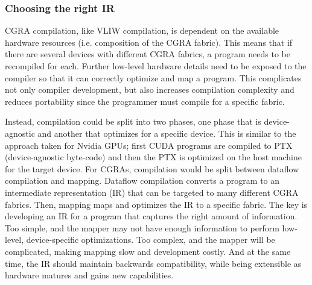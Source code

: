 \subsubsection{Choosing the right IR}
CGRA compilation, like VLIW compilation, is dependent on the available hardware resources (i.e. composition of the CGRA fabric).
% 
% 
This means that if there are several devices with different CGRA fabrics, a program needs to be recompiled for each.
% 
Further low-level hardware details need to be exposed to the compiler so that it can correctly optimize and map a program.
% 
This complicates not only compiler development, but also increases compilation complexity and reduces portability since the programmer must compile for a specific fabric.


Instead, compilation could be split into two phases, one phase that is device-agnostic and another that optimizes for a specific device.
% 
This is similar to the approach taken for Nvidia GPUs; first CUDA programs are compiled to PTX~\cite{ptx} (device-agnostic byte-code) and then the PTX is optimized on the host machine for the target device.
% 
For CGRAs, compilation would be split between dataflow compilation and mapping.
% 
Dataflow compilation converts a program to an intermediate representation (IR) that can be targeted to many different CGRA fabrics.
% 
Then, mapping maps and optimizes the IR to a specific fabric.
% 
The key is developing an IR for a program that captures the right amount of information.
% 
Too simple, and the mapper may not have enough information to perform low-level, device-specific optimizations.
% 
Too complex, and the mapper will be complicated, making mapping slow and development costly.
%
And at the same time, the IR should maintain backwards compatibility, while being extensible as hardware matures and gains new capabilities.
% 

